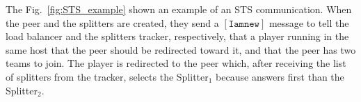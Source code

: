 \begin{figure*}
\caption{Timeline example of an STS interaction.\label{fig:STS_example}}
\end{figure*}

The Fig.~\ref{fig:STS_example} shown an example of an STS
communication. When the peer and the splitters are created, they send
a $[\mathtt{I}\mathtt{am}\mathtt{new}]$ message to tell the load balancer and the
splitters tracker, respectively, that a player running in the same
host that the peer should be redirected toward it, and that the peer
has two teams to join. The player is redirected to the peer which,
after receiving the list of splitters from the tracker, selects the
Splitter$_1$ because answers first than the Splitter$_2$.

